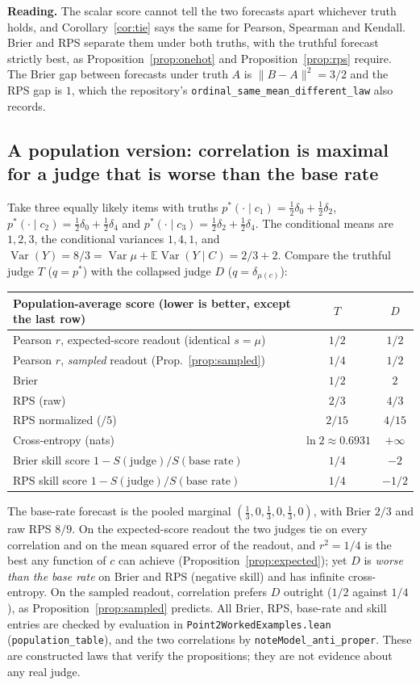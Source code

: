 \documentclass[11pt]{article}
\theoremstyle{remark}
\theoremstyle{definition}
\newcommand{\E}{\mathbb{E}}
\newcommand{\Var}{\operatorname{Var}}
\newcommand{\pstar}{p^{*}}
\newcommand{\1}{\mathbf{1}}
\newcommand{\file}[1]{\nolinkurl{#1}}
\begin{document}
\textbf{Reading.} The scalar score cannot tell the two forecasts apart whichever truth holds, and Corollary~\ref{cor:tie} says the same for Pearson, Spearman and Kendall. Brier and RPS separate them under both truths, with the truthful forecast strictly best, as Proposition~\ref{prop:onehot} and Proposition~\ref{prop:rps} require. The Brier gap between forecasts under truth $A$ is $\|B-A\|^{2}=3/2$ and the RPS gap is $1$, which the repository's \texttt{ordinal\_same\_mean\_different\_law} also records.

\subsection{A population version: correlation is maximal for a judge that is worse than the base rate}

Take three equally likely items with truths $\pstar(\cdot\mid c_1)=\tfrac12\delta_0+\tfrac12\delta_2$, $\pstar(\cdot\mid c_2)=\tfrac12\delta_0+\tfrac12\delta_4$ and $\pstar(\cdot\mid c_3)=\tfrac12\delta_2+\tfrac12\delta_4$. The conditional means are $1,2,3$, the conditional variances $1,4,1$, and $\Var(Y)=8/3=\Var\mu+\E\Var(Y\mid C)=2/3+2$. Compare the truthful judge $T$ ($q=\pstar$) with the collapsed judge $D$ ($q=\delta_{\mu(c)}$):

\begin{center}
\begin{tabular}{lcc}
\toprule
Population-average score (lower is better, except the last row) & $T$ & $D$ \\
\midrule
Pearson $r$, expected-score readout (identical $s=\mu$) & $1/2$ & $1/2$ \\
Pearson $r$, \emph{sampled} readout (Prop.~\ref{prop:sampled}) & $1/4$ & $1/2$ \\
Brier & $1/2$ & $2$ \\
RPS (raw) & $2/3$ & $4/3$ \\
RPS normalized ($/5$) & $2/15$ & $4/15$ \\
Cross-entropy (nats) & $\ln2\approx0.6931$ & $+\infty$ \\
Brier skill score $1-S(\text{judge})/S(\text{base rate})$ & $1/4$ & $-2$ \\
RPS skill score $1-S(\text{judge})/S(\text{base rate})$ & $1/4$ & $-1/2$ \\
\bottomrule
\end{tabular}
\end{center}
The base-rate forecast is the pooled marginal $(\tfrac13,0,\tfrac13,0,\tfrac13,0)$, with Brier $2/3$ and raw RPS $8/9$. On the expected-score readout the two judges tie on every correlation and on the mean squared error of the readout, and $r^{2}=1/4$ is the best any function of $c$ can achieve (Proposition~\ref{prop:expected}); yet $D$ is \emph{worse than the base rate} on Brier and RPS (negative skill) and has infinite cross-entropy. On the sampled readout, correlation prefers $D$ outright ($1/2$ against $1/4$), as Proposition~\ref{prop:sampled} predicts. All Brier, RPS, base-rate and skill entries are checked by evaluation in \file{Point2WorkedExamples.lean} (\texttt{population\_table}), and the two correlations by \texttt{noteModel\_anti\_proper}. These are constructed laws that verify the propositions; they are not evidence about any real judge.
\end{document}
